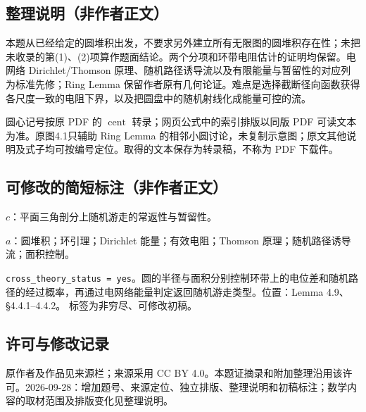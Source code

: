 \documentclass[UTF8,11pt]{ctexart}
\theoremstyle{definition}
\begin{document}
\subsection*{整理说明（非作者正文）}
本题从已经给定的圆堆积出发，不要求另外建立所有无限图的圆堆积存在性；未把未收录的第(1)、(2)项算作题面结论。两个分项和环带电阻估计的证明均保留。电网络 Dirichlet/Thomson 原理、随机路径诱导流以及有限能量与暂留性的对应列为标准先修；Ring Lemma 保留作者原有几何论证。难点是选择截断径向函数获得各尺度一致的电阻下界，以及把圆盘中的随机射线化成能量可控的流。

圆心记号按原 PDF 的 $\operatorname{cent}$ 转录；网页公式中的索引排版以同版 PDF 可读文本为准。原图4.1只辅助 Ring Lemma 的相邻小圆讨论，未复制示意图；原文其他说明及式子均可按编号定位。取得的文本保存为转录稿，不称为 PDF 下载件。
\subsection*{可修改的简短标注（非作者正文）}
$c$：平面三角剖分上随机游走的常返性与暂留性。

$a$：圆堆积；环引理；Dirichlet 能量；有效电阻；Thomson 原理；随机路径诱导流；面积控制。

\texttt{cross\_theory\_status = yes}。圆的半径与面积分别控制环带上的电位差和随机路径的经过概率，再通过电网络能量判定返回随机游走类型。位置：Lemma 4.9、\S4.4.1--4.4.2。
标签为非穷尽、可修改初稿。
\subsection*{许可与修改记录}
原作者及作品见来源栏；来源采用 CC BY 4.0。本题证摘录和附加整理沿用该许可。2026-09-28：增加题号、来源定位、独立排版、整理说明和初稿标注；数学内容的取材范围及排版变化见整理说明。
\end{document}
